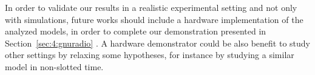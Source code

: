 %
%
%

In order to validate our results in a realistic experimental setting and not only with simulations, future works should include a hardware implementation of the analyzed models, in order to complete our demonstration presented in Section~\ref{sec:4:gnuradio} \cite{Besson2018ICT,Besson2019WCNC}.
%
A hardware demonstrator could be also benefit to study other settings by relaxing some hypotheses, for instance by studying a similar model in non-slotted time.



